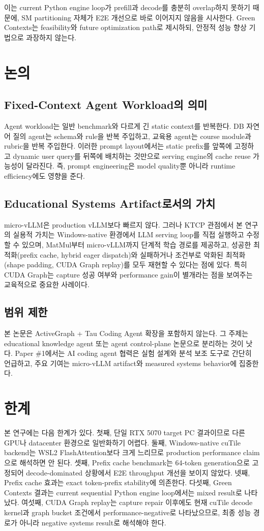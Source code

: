 \documentclass{kcc}
\begin{document}
이는 current Python engine loop가 prefill과 decode를 충분히 overlap하지 못하기 때문에, SM partitioning 자체가 E2E 개선으로 바로 이어지지 않음을 시사한다. Green Contexts는 feasibility와 future optimization path로 제시하되, 안정적 성능 향상 기법으로 과장하지 않는다.

\section{논의}
\subsection{Fixed-Context Agent Workload의 의미}
Agent workload는 일반 benchmark와 다르게 긴 static context를 반복한다. DB 자연어 질의 agent는 schema와 rule을 반복 주입하고, 교육용 agent는 course module과 rubric을 반복 주입한다. 이러한 prompt layout에서는 static prefix를 앞쪽에 고정하고 dynamic user query를 뒤쪽에 배치하는 것만으로 serving engine의 cache reuse 가능성이 달라진다. 즉, prompt engineering은 model quality뿐 아니라 runtime efficiency에도 영향을 준다.

\subsection{Educational Systems Artifact로서의 가치}
micro-vLLM은 production vLLM보다 빠르지 않다. 그러나 KTCP 관점에서 본 연구의 실용적 가치는 Windows-native 환경에서 LLM serving loop를 직접 실행하고 수정할 수 있으며, MatMul부터 micro-vLLM까지 단계적 학습 경로를 제공하고, 성공한 최적화(prefix cache, hybrid eager dispatch)와 실패하거나 조건부로 악화된 최적화(shape padding, CUDA Graph replay)를 모두 재현할 수 있다는 점에 있다. 특히 CUDA Graph는 capture 성공 여부와 performance gain이 별개라는 점을 보여주는 교육적으로 중요한 사례이다.

\subsection{범위 제한}
본 논문은 ActiveGraph + Tau Coding Agent 확장을 포함하지 않는다. 그 주제는 educational knowledge agent 또는 agent control-plane 논문으로 분리하는 것이 낫다. Paper \#1에서는 AI coding agent 협력은 실험 설계와 분석 보조 도구로 간단히 언급하고, 주요 기여는 micro-vLLM artifact와 measured systems behavior에 집중한다.

\section{한계}
본 연구에는 다음 한계가 있다. 첫째, 단일 RTX 5070 target PC 결과이므로 다른 GPU나 datacenter 환경으로 일반화하기 어렵다. 둘째, Windows-native cuTile backend는 WSL2 FlashAttention보다 크게 느리므로 production performance claim으로 해석하면 안 된다. 셋째, Prefix cache benchmark는 64-token generation으로 고정되어 decode-dominated 상황에서 E2E throughput 개선을 보이지 않았다. 넷째, Prefix cache 효과는 exact token-prefix stability에 의존한다. 다섯째, Green Contexts 결과는 current sequential Python engine loop에서는 mixed result로 나타났다. 여섯째, CUDA Graph replay는 capture repair 이후에도 현재 cuTile decode kernel과 graph bucket 조건에서 performance-negative로 나타났으므로, 최종 성능 경로가 아니라 negative systems result로 해석해야 한다.
\end{document}
